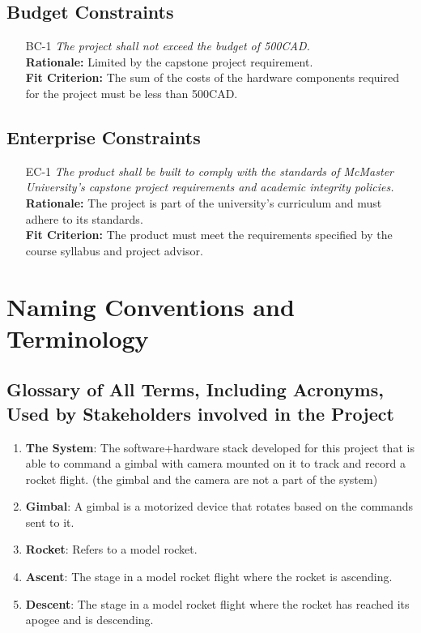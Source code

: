 \documentclass[12pt]{article}
\begin{document}
\subsection{Budget Constraints}

\begin{itemize}[leftmargin=*]
  \item[BC-1] \emph{The project shall not exceed the budget of 500CAD.}\\[2mm]
        \textbf{Rationale:} Limited by the capstone project requirement.\\
        \textbf{Fit Criterion:} The sum of the costs of the hardware components required for the project must be less than 500CAD.
\end{itemize}

\subsection{Enterprise Constraints}

\begin{itemize}[leftmargin=*]
  \item[EC-1] \emph{The product shall be built to comply with the standards of McMaster
          University's capstone project requirements and academic integrity policies.}\\[2mm]
        \textbf{Rationale:} The project is part of the university's curriculum and must adhere to its standards.\\
        \textbf{Fit Criterion:} The product must meet the requirements specified by the course syllabus and project advisor.
\end{itemize}

\section{Naming Conventions and Terminology}
\subsection{Glossary of All Terms, Including Acronyms, Used by Stakeholders
  involved in the Project}

\begin{enumerate}
  \item \textbf{The System}: The software+hardware stack developed for this project that is able to command a gimbal with camera mounted on it to track and record a rocket flight. (the gimbal and the camera are not a part of the system)
  \item \textbf{Gimbal}: A gimbal is a motorized device that rotates based on the commands sent to it.
  \item \textbf{Rocket}: Refers to a model rocket.
  \item \textbf{Ascent}: The stage in a model rocket flight where the rocket is ascending.
  \item \textbf{Descent}: The stage in a model rocket flight where the rocket has reached its apogee and is descending.
\end{enumerate}
\end{document}
